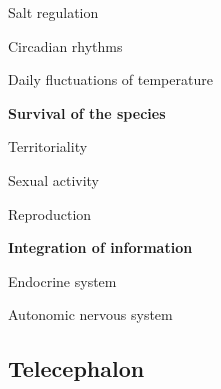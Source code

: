 \begin{coloredlist}
\begin{coloredlist}
\begin{coloredlist}
\begin{coloredlist}
                \item Salt regulation
            \end{coloredlist}
            \item {}
            \begin{coloredlist}
                \item Circadian rhythms
                \item Daily fluctuations of temperature
            \end{coloredlist}
        \end{coloredlist}
        \item \textbf{Survival of the species}
        \begin{coloredlist}
            \item Territoriality
            \item Sexual activity
            \item Reproduction
        \end{coloredlist}
        \item \textbf{Integration of information}
        \begin{coloredlist}
            \item Endocrine system
            \item Autonomic nervous system
        \end{coloredlist}
    \end{coloredlist}
\end{coloredlist}

\subsection{Telecephalon}

